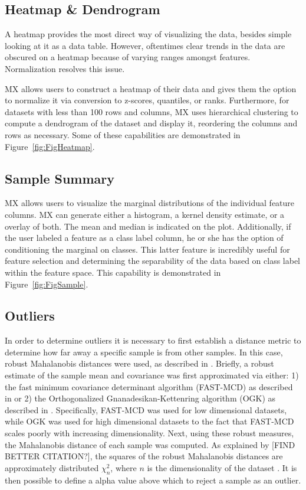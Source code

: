 \documentclass[12pt]{article}
\begin{document}
\subsection{Heatmap \& Dendrogram}
\label{subsec:SubSecHeatmap}

A heatmap provides the most direct way of visualizing the data, besides simple looking at it as a data table. However, oftentimes clear trends in the data are obscured on a heatmap because of varying ranges amongst features. Normalization resolves this issue.

MX allows users to construct a heatmap of their data and gives them the option to normalize it via conversion to z-scores, quantiles, or ranks. Furthermore, for datasets with less than 100 rows and columns, MX uses hierarchical clustering to compute a dendrogram of the dataset and display it, reordering the columns and rows as necessary. Some of these capabilities are demonstrated in Figure~\ref{fig:FigHeatmap}. 

\subsection{Sample Summary}
\label{subsec:SubSecSample}

MX allows users to visualize the marginal distributions of the individual feature columns. MX can generate either a histogram, a kernel density estimate, or a overlay of both. The mean and median is indicated on the plot. Additionally, if the user labeled a feature as a class label column, he or she has the option of conditioning the marginal on classes. This latter feature is incredibly useful for feature selection and determining the separability of the data based on class label within the feature space. This capability is demonstrated in Figure~\ref{fig:FigSample}. 

\subsection{Outliers}
\label{subsec:SubSecOutliers}

In order to determine outliers it is necessary to first establish a distance metric to determine how far away a specific sample is from other samples. In this case, robust Mahalanobis distances were used, as described in \cite{hubert2008high}. Briefly, a robust estimate of the sample mean and covariance was first approximated via either: 1) the fast minimum covariance determinant algorithm (FAST-MCD) as described in \cite{rousseeuw1999fast} or 2) the Orthogonalized Gnanadesikan-Kettenring algorithm (OGK) as described in \cite{maronna2002robust}. Specifically, FAST-MCD was used for low dimensional datasets, while OGK was used for high dimensional datasets to the fact that FAST-MCD scales poorly with increasing dimensionality. Next, using these robust measures, the Mahalanobis distance of each sample was computed. As explained by \cite{hardin2012distribution} [FIND BETTER CITATION?], the squares of the robust Mahalanobis distances are approximately distributed $\chi^2_n$, where $n$ is the dimensionality of the dataset . It is then possible to define a alpha value above which to reject a sample as an outlier. 
\end{document}
